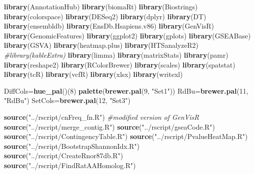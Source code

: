 \documentclass[
]{book}
\newenvironment{Shaded}{\begin{snugshade}}{\end{snugshade}}
\newcommand{\CommentTok}[1]{\textcolor[rgb]{0.56,0.35,0.01}{\textit{#1}}}
\newcommand{\DecValTok}[1]{\textcolor[rgb]{0.00,0.00,0.81}{#1}}
\newcommand{\KeywordTok}[1]{\textcolor[rgb]{0.13,0.29,0.53}{\textbf{#1}}}
\newcommand{\NormalTok}[1]{#1}
\newcommand{\StringTok}[1]{\textcolor[rgb]{0.31,0.60,0.02}{#1}}
\begin{document}
\begin{Shaded}
\begin{Highlighting}[]
\KeywordTok{library}\NormalTok{(AnnotationHub)}
\KeywordTok{library}\NormalTok{(biomaRt)}
\KeywordTok{library}\NormalTok{(Biostrings)}
\KeywordTok{library}\NormalTok{(colorspace)}
\KeywordTok{library}\NormalTok{(DESeq2)}
\KeywordTok{library}\NormalTok{(dplyr)}
\KeywordTok{library}\NormalTok{(DT)}
\KeywordTok{library}\NormalTok{(ensembldb)}
\KeywordTok{library}\NormalTok{(EnsDb.Hsapiens.v86)}
\KeywordTok{library}\NormalTok{(GenVisR)}
\KeywordTok{library}\NormalTok{(GenomicFeatures)}
\KeywordTok{library}\NormalTok{(ggplot2)}
\KeywordTok{library}\NormalTok{(gplots)}
\KeywordTok{library}\NormalTok{(GSEABase)}
\KeywordTok{library}\NormalTok{(GSVA)}
\KeywordTok{library}\NormalTok{(heatmap.plus)}
\KeywordTok{library}\NormalTok{(HTSanalyzeR2)}
\CommentTok{#library(kableExtra)}
\KeywordTok{library}\NormalTok{(limma)}
\KeywordTok{library}\NormalTok{(matrixStats)}
\KeywordTok{library}\NormalTok{(pamr)}
\KeywordTok{library}\NormalTok{(reshape2)}
\KeywordTok{library}\NormalTok{(RColorBrewer)}
\KeywordTok{library}\NormalTok{(scales)}
\KeywordTok{library}\NormalTok{(spatstat)}
\KeywordTok{library}\NormalTok{(tcR)}
\KeywordTok{library}\NormalTok{(vcfR)}
\KeywordTok{library}\NormalTok{(xlsx)}
\KeywordTok{library}\NormalTok{(writexl)}

\NormalTok{DiffCols=}\KeywordTok{hue_pal}\NormalTok{()(}\DecValTok{8}\NormalTok{)}
\KeywordTok{palette}\NormalTok{(}\KeywordTok{brewer.pal}\NormalTok{(}\DecValTok{9}\NormalTok{, }\StringTok{"Set1"}\NormalTok{))}
\NormalTok{RdBu=}\KeywordTok{brewer.pal}\NormalTok{(}\DecValTok{11}\NormalTok{, }\StringTok{"RdBu"}\NormalTok{)}
\NormalTok{SetCols=}\KeywordTok{brewer.pal}\NormalTok{(}\DecValTok{12}\NormalTok{, }\StringTok{"Set3"}\NormalTok{)}

\KeywordTok{source}\NormalTok{(}\StringTok{"../rscript/cnFreq_fn.R"}\NormalTok{) }\CommentTok{#modified version of GenVisR}
\KeywordTok{source}\NormalTok{(}\StringTok{"../rscript/merge_contig.R"}\NormalTok{)}
\KeywordTok{source}\NormalTok{(}\StringTok{"../rscript/gseaCode.R"}\NormalTok{)}
\KeywordTok{source}\NormalTok{(}\StringTok{"../rscript/ContingencyTable.R"}\NormalTok{)}
\KeywordTok{source}\NormalTok{(}\StringTok{"../rscript/PvalueHeatMap.R"}\NormalTok{)}
\KeywordTok{source}\NormalTok{(}\StringTok{"../rscript/BootstrapShannonIdx.R"}\NormalTok{)}
\KeywordTok{source}\NormalTok{(}\StringTok{"../rscript/CreateRnor87db.R"}\NormalTok{)}
\KeywordTok{source}\NormalTok{(}\StringTok{"../rscript/FindRatAAHomolog.R"}\NormalTok{)}


\end{Highlighting}
\end{Shaded}
\end{document}

